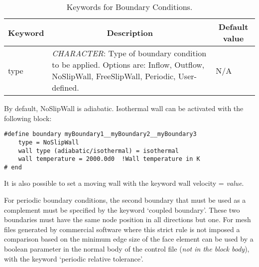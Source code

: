 \documentclass[a4paper,10pt]{report}
\begin{document}
\begin{table}[h]
\caption{Keywords for Boundary Conditions.}\label{tab:BC}

\begin{tabular}{|p{4cm}|p{10cm}|p{2.2cm}|}
\hline
\multicolumn{1}{|c|}{\textbf{Keyword}} & \multicolumn{1}{c|}{\textbf{Description}} & \multicolumn{1}{c|}{\textbf{Default value}} \\ \hline

type 	&
		\textit{CHARACTER}: Type of boundary condition to be applied. Options are: Inflow, Outflow, NoSlipWall, FreeSlipWall, Periodic, User-defined. &
							N/A \\ \hline

\end{tabular}
\end{table}

By default, NoSlipWall is adiabatic. Isothermal wall can be activated with the following block:

\begin{lstlisting}
#define boundary myBoundary1__myBoundary2__myBoundary3
	type = NoSlipWall
	wall type (adiabatic/isothermal) = isothermal
	wall temperature = 2000.0d0  !Wall temperature in K
# end
\end{lstlisting}

It is also possible to set a moving wall with the keyword wall velocity = \emph{value}. 

For periodic boundary conditions, the second boundary that must be used as a complement must be specified by the keyword `coupled boundary'. These two boundaries must have the same node position in all directions but one. For mesh files generated by commercial software where this strict rule is not imposed a comparison based on the minimum edge size of the face element can be used by a boolean parameter in the normal body of the control file (\emph{not in the block body}), with the keyword `periodic relative tolerance'.

\vspace{0.5 in}
\end{document}
